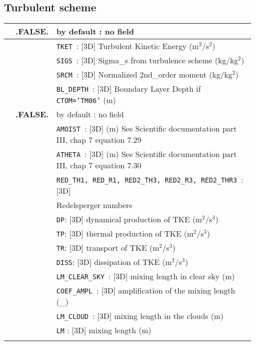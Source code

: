 \subsection{Turbulent scheme}
\begin{center}
\begin{makeimage}
\begin{tabular}{|>{\centering}p{3cm}|>{\centering}p{2.5cm}|p{11cm}|}
 \hline
\multirow{4}{*}{LVAR\_TURB}\index{LVAR\_TURB!\innam{NAM\_DIAG}}&\textbf{.FALSE.} & by default : no field \\\cline{2-3}
&\multirow{2}{*}{.TRUE.} & {\tt TKET }: [3D] Turbulent Kinetic Energy (m$^2$/s$^2$)\\\cline{3-3}
& &  {\tt SIGS }: [3D] Sigma\_s from turbulence scheme (kg/kg$^2$) \\\cline{3-3}
& & {\tt SRCM }: [3D] Normalized 2nd\_order moment (kg/kg$^2$)\\\cline{3-3}
& &{\tt BL\_DEPTH }: [3D] Boundary Layer Depth if {\tt CTOM='TM06'} (m) \\ \hline 
\hline 
\multirow{21}{*}{LTURBDIAG}\index{LTURBDIAG!\innam{NAM\_DIAG}}&\textbf{.FALSE.} & by default : no field \\\cline{2-3}
 &\multirow{21}{*}{.TRUE.} & {\tt AMOIST }: [3D] (m) See Scientific documentation part III, chap 7 equation 7.29\\\cline{3-3}
& & {\tt ATHETA }: [3D] (m)  See Scientific documentation part III, chap 7 equation 7.30\\\cline{3-3}
& &{\tt RED\_TH1, RED\_R1, RED2\_TH3, RED2\_R3, RED2\_THR3 }: [3D] \\
& & Redelsperger numbers \\\cline{3-3}
& &{\tt DP}: [3D] dynamical production of TKE (m$^2$/s$^3$) \\\cline{3-3}
& &{\tt TP}: [3D] thermal production of TKE (m$^2$/s$^3$) \\\cline{3-3}
& &{\tt  TR}: [3D]  transport of TKE (m$^2$/s$^3$) \\\cline{3-3}
& &{\tt  DISS}: [3D] dissipation of TKE (m$^2$/s$^3$)\\\cline{3-3}
& &{\tt  LM\_CLEAR\_SKY }: [3D]  mixing length in clear sky (m) \\\cline{3-3}
& &{\tt COEF\_AMPL }: [3D] amplification of the mixing length (\_) \\\cline{3-3}
& &{\tt LM\_CLOUD }: [3D]  mixing length in the clouds (m) \\\cline{3-3}
& & {\tt LM} : [3D] mixing length (m)\\\cline{3-3}

\end{tabular}
\end{makeimage}
\end{center}

